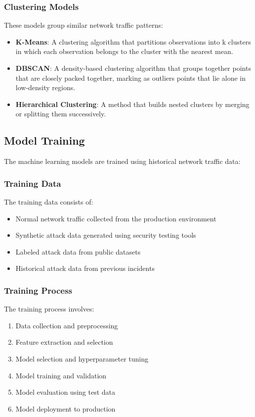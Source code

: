 \subsubsection{Clustering Models}
These models group similar network traffic patterns:

\begin{itemize}
    \item \textbf{K-Means}: A clustering algorithm that partitions observations into k clusters in which each observation belongs to the cluster with the nearest mean.
    
    \item \textbf{DBSCAN}: A density-based clustering algorithm that groups together points that are closely packed together, marking as outliers points that lie alone in low-density regions.
    
    \item \textbf{Hierarchical Clustering}: A method that builds nested clusters by merging or splitting them successively.
\end{itemize}

\subsection{Model Training}
The machine learning models are trained using historical network traffic data:

\subsubsection{Training Data}
The training data consists of:

\begin{itemize}
    \item Normal network traffic collected from the production environment
    \item Synthetic attack data generated using security testing tools
    \item Labeled attack data from public datasets
    \item Historical attack data from previous incidents
\end{itemize}

\subsubsection{Training Process}
The training process involves:

\begin{enumerate}
    \item Data collection and preprocessing
    \item Feature extraction and selection
    \item Model selection and hyperparameter tuning
    \item Model training and validation
    \item Model evaluation using test data
    \item Model deployment to production
\end{enumerate}

